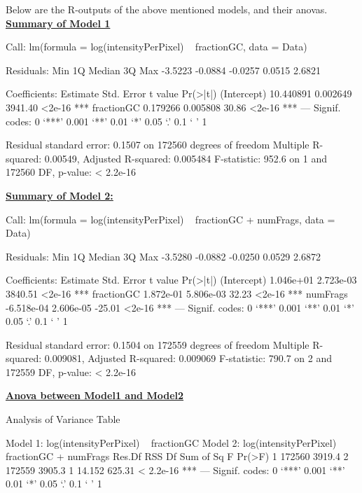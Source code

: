 \documentclass[11pt]{article}
\begin{document}
Below are the R-outputs of the above mentioned models, and their anovas.\\
\noindent
{\bf{\underline{Summary of Model 1}}}
\begin{Schunk}
\begin{Soutput}
Call:
lm(formula = log(intensityPerPixel) ~ fractionGC, data = Data)

Residuals:
    Min      1Q  Median      3Q     Max 
-3.5223 -0.0884 -0.0257  0.0515  2.6821 

Coefficients:
             Estimate Std. Error t value Pr(>|t|)    
(Intercept) 10.440891   0.002649 3941.40   <2e-16 ***
fractionGC   0.179266   0.005808   30.86   <2e-16 ***
---
Signif. codes:  0 ‘***’ 0.001 ‘**’ 0.01 ‘*’ 0.05 ‘.’ 0.1 ‘ ’ 1 

Residual standard error: 0.1507 on 172560 degrees of freedom
Multiple R-squared: 0.00549,	Adjusted R-squared: 0.005484 
F-statistic: 952.6 on 1 and 172560 DF,  p-value: < 2.2e-16 
\end{Soutput}
\end{Schunk}
\noindent
{\bf{\underline{Summary of Model 2:}}}
\begin{Schunk}
\begin{Soutput}
Call:
lm(formula = log(intensityPerPixel) ~ fractionGC + numFrags, 
    data = Data)

Residuals:
    Min      1Q  Median      3Q     Max 
-3.5280 -0.0882 -0.0250  0.0529  2.6872 

Coefficients:
              Estimate Std. Error t value Pr(>|t|)    
(Intercept)  1.046e+01  2.723e-03 3840.51   <2e-16 ***
fractionGC   1.872e-01  5.806e-03   32.23   <2e-16 ***
numFrags    -6.518e-04  2.606e-05  -25.01   <2e-16 ***
---
Signif. codes:  0 ‘***’ 0.001 ‘**’ 0.01 ‘*’ 0.05 ‘.’ 0.1 ‘ ’ 1 

Residual standard error: 0.1504 on 172559 degrees of freedom
Multiple R-squared: 0.009081,	Adjusted R-squared: 0.009069 
F-statistic: 790.7 on 2 and 172559 DF,  p-value: < 2.2e-16 
\end{Soutput}
\end{Schunk}
\noindent
{\bf{\underline{Anova between Model1 and Model2}}}
\begin{Schunk}
\begin{Soutput}
Analysis of Variance Table

Model 1: log(intensityPerPixel) ~ fractionGC
Model 2: log(intensityPerPixel) ~ fractionGC + numFrags
  Res.Df    RSS Df Sum of Sq      F    Pr(>F)    
1 172560 3919.4                                  
2 172559 3905.3  1    14.152 625.31 < 2.2e-16 ***
---
Signif. codes:  0 ‘***’ 0.001 ‘**’ 0.01 ‘*’ 0.05 ‘.’ 0.1 ‘ ’ 1 
\end{Soutput}
\end{Schunk}
\end{document}

